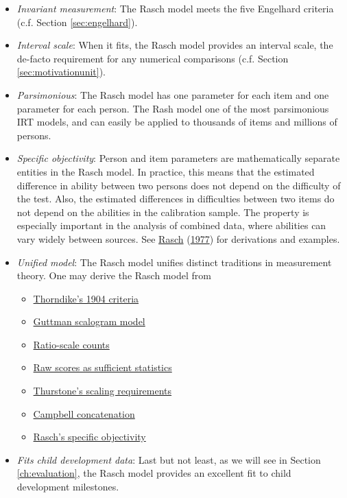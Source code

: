 \documentclass[
]{book}
\providecommand{\tightlist}{%
  \setlength{\itemsep}{0pt}\setlength{\parskip}{0pt}}
\begin{document}
\begin{itemize}
\tightlist
\item
  \emph{Invariant measurement}: The Rasch model meets the five Engelhard criteria (c.f. Section \ref{sec:engelhard}).
\item
  \emph{Interval scale}: When it fits, the Rasch model provides an interval scale, the de-facto requirement for any numerical comparisons (c.f. Section \ref{sec:motivationunit}).
\item
  \emph{Parsimonious}: The Rasch model has one parameter for each item and one parameter for each person. The Rash model one of the most parsimonious IRT models, and can easily be applied to thousands of items and millions of persons.
\item
  \emph{Specific objectivity}: Person and item parameters are mathematically separate entities in the Rasch model. In practice, this means that the estimated difference in ability between two persons does not depend on the difficulty of the test. Also, the estimated differences in difficulties between two items do not depend on the abilities in the calibration sample. The property is especially important in the analysis of combined data, where abilities can vary widely between sources. See \protect\hyperlink{ref-rasch1977}{Rasch} (\protect\hyperlink{ref-rasch1977}{1977}) for derivations and examples.
\item
  \emph{Unified model}: The Rasch model unifies distinct traditions in measurement theory. One may derive the Rasch model from

  \begin{itemize}
  \tightlist
  \item
    \href{https://www.rasch.org/rmt/rmt143g.htm}{Thorndike's 1904 criteria}
  \item
    \href{https://www.rasch.org/rmt/rmt63e.htm}{Guttman scalogram model}
  \item
    \href{https://www.rasch.org/rmt/rmt62c.htm}{Ratio-scale counts}
  \item
    \href{https://www.rasch.org/rmt/rmt32e.htm}{Raw scores as sufficient statistics}
  \item
    \href{https://www.rasch.org/rmt/rmt21a.htm}{Thurstone's scaling requirements}
  \item
    \href{https://www.rasch.org/rmt/rmt21b.htm}{Campbell concatenation}
  \item
    \href{https://www.rasch.org/rmt/rmt11a.htm}{Rasch's specific objectivity}
  \end{itemize}
\item
  \emph{Fits child development data}: Last but not least, as we will see in Section \ref{ch:evaluation}, the Rasch model provides an excellent fit to child development milestones.
\end{itemize}
\end{document}
